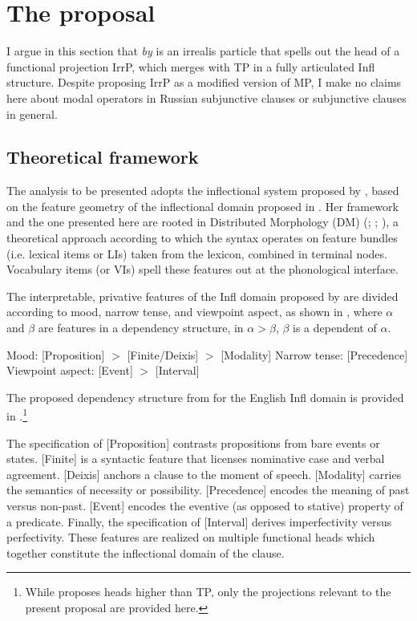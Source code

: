 \documentclass[output=paper,
modfonts,
newtxmath,
hidelinks,
]{langscibook}
\begin{document}
\section{The proposal}\label{10:s4}

I argue in this section that \textit{by} is an irrealis particle that spells out the head of a functional projection IrrP, which merges with TP in a fully articulated Infl structure. Despite proposing IrrP as a modified version of  MP, I make no claims here about modal operators in Russian subjunctive clauses or subjunctive clauses in general. 

\subsection{Theoretical framework}\label{10:s4.1}

The analysis to be presented adopts the inflectional system proposed by \citet{Cowper2010}, based on the feature geometry of the inflectional domain proposed in \citet{Cowper2005}. Her framework and the one presented here are rooted in Distributed Morphology (DM) (\citealt{HalleMarantz1993}; \citealt{EmbickNoyer2007}; \citealt{Bobaljik}), a theoretical approach according to which the syntax operates on feature bundles (i.e. lexical items or LIs) taken from the lexicon, combined in terminal nodes. Vocabulary items (or VIs) spell these features out at the phonological interface. 

The interpretable, privative features of the Infl domain proposed by \citet{Cowper2005} are divided according to mood, narrow tense, and viewpoint aspect, as shown in , where $\alpha$ and $\beta$ are features in a dependency structure, in $\alpha >\beta$, $\beta$ is a dependent of $\alpha$.\largerpage[2]

\ea \label{10:ex22}
Mood: [Proposition] $>$ [Finite/Deixis] $>$ [Modality]
\newline Narrow tense: [Precedence]
\newline Viewpoint aspect: [Event] $>$ [Interval] \hfill \citep[1]{Cowper2010}
\z


\noindent The proposed dependency structure from \citet{Cowper2010} for the English Infl domain is provided in .\footnote{\label{10:fn1}While \citet{Cowper2010} proposes heads higher than TP, only the projections relevant to the present proposal are provided here.}

The specification of [Proposition] contrasts propositions from bare events or states. [Finite] is a syntactic feature that licenses nominative case and verbal agreement. [Deixis] anchors a clause to the moment of speech. [Modality] carries the semantics of necessity or possibility. [Precedence] encodes the meaning of past versus non-past. [Event] encodes the eventive (as opposed to stative) property of a predicate. Finally, the specification of [Interval] derives imperfectivity versus perfectivity. These features are realized on multiple functional heads which together constitute the inflectional domain of the clause.
\end{document}

